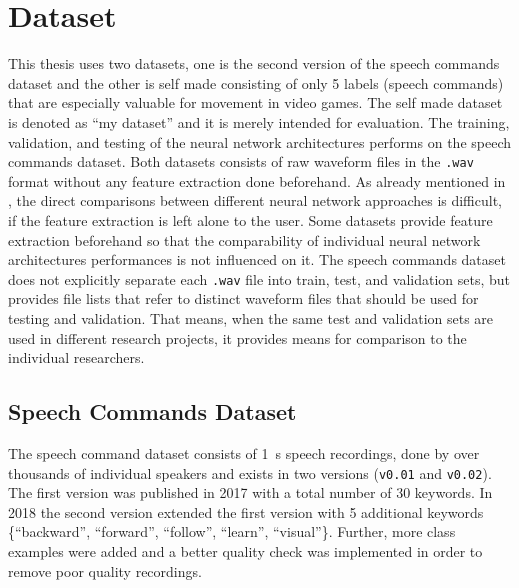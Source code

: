 
\section{Dataset}\label{sec:exp_dataset}
This thesis uses two datasets, one is the second version of the speech commands dataset \cite{Warden2018} and the other is self made consisting of only 5 labels (speech commands) that are especially valuable for movement in video games.
The self made dataset is denoted as \enquote{my dataset} and it is merely intended for evaluation.
The training, validation, and testing of the neural network architectures performs on the speech commands dataset.
Both datasets consists of raw waveform files in the \texttt{.wav} format without any feature extraction done beforehand.
As already mentioned in , the direct comparisons between different neural network approaches is difficult, if the feature extraction is left alone to the user.
Some datasets provide feature extraction beforehand so that the comparability of individual neural network architectures performances is not influenced on it.
The speech commands dataset does not explicitly separate each \texttt{.wav} file into train, test, and validation sets, but provides file lists that refer to distinct waveform files that should be used for testing and validation. 
That means, when the same test and validation sets are used in different research projects, it provides means for comparison to the individual researchers.



\subsection{Speech Commands Dataset}\label{sec:exp_dataset_speech_cmd}
The speech command dataset \cite{Warden2018} consists of \SI{1}{\second} speech recordings, done by over thousands of individual speakers and exists in two versions (\texttt{v0.01} and \texttt{v0.02}).
The first version was published in 2017 with a total number of 30 keywords.
In 2018 the second version extended the first version with 5 additional keywords \{\enquote{backward}, \enquote{forward}, \enquote{follow}, \enquote{learn}, \enquote{visual}\}.
Further, more class examples were added and a better quality check was implemented in order to remove poor quality recordings.

